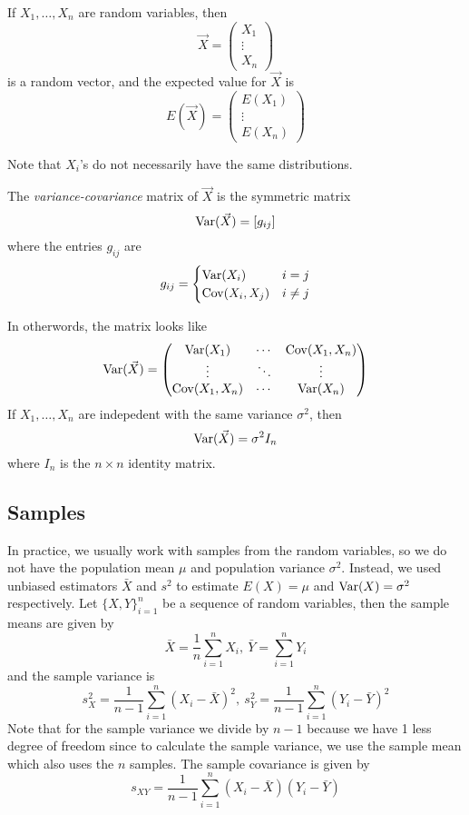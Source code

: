 \begin{definition}
    If $X_1, \ldots, X_n$ are random variables, then 
    \[\vec{X} = \begin{pmatrix}
        X_1 \\ \vdots \\ X_n
    \end{pmatrix}\]
    is a random vector, and the expected value for $\vec{X}$ is 
    \[E(\vec{X}) = \begin{pmatrix}
        E(X_1) \\ \vdots \\ E(X_n)
    \end{pmatrix}\]
\end{definition}
Note that $X_i$'s do not necessarily have the same distributions.
\begin{definition}
    The \emph{variance-covariance} matrix of $\vec{X}$ is the symmetric matrix 
    \[\operatorname{Var}(\vec{X}) = [g_{ij}]\]
    where the entries $g_{ij}$ are 
    \[g_{ij} = \begin{cases}
        \operatorname{Var}(X_i) & i = j\\
        \operatorname{Cov}(X_i, X_j) & i \neq j
    \end{cases}\]
\end{definition}
In otherwords, the matrix looks like 
\[\operatorname{Var}(\vec{X}) = \begin{pmatrix}
    \operatorname{Var}(X_1) & \cdots & \operatorname{Cov}(X_1,X_n) \\
    \vdots & \ddots & \vdots \\
    \operatorname{Cov}(X_1, X_n) & \cdots & \operatorname{Var}(X_n)
\end{pmatrix}\]
If $X_1, \ldots, X_n$ are indepedent with the same variance $\sigma^2$, then 
\[\operatorname{Var}(\Vec{X}) = \sigma^2I_n\]
where $I_n$ is the $n\times n$ identity matrix.
\subsection{Samples}
In practice, we usually work with samples from the random variables, so we do not have the population mean $\mu$ and population variance $\sigma^2$. Instead, we used unbiased estimators $\bar{X}$ and $s^2$ to estimate $E(X) = \mu$ and $\operatorname{Var}(X) = \sigma^2$ respectively. Let $\{X, Y\}_{i=1}^n$ be a sequence of random variables, then the sample means are given by 
\[\bar{X} = \frac{1}{n}\sum_{i=1}^n X_i, \ \bar{Y} = \sum_{i=1}^n Y_i\]
and the sample variance is 
\[s_X^2 = \frac{1}{n-1}\sum_{i=1}^n(X_i - \bar{X})^2, \ s_Y^2 = \frac{1}{n-1}\sum_{i=1}^n (Y_i - \bar{Y})^2\]
Note that for the sample variance we divide by $n-1$ because we have 1 less degree of freedom since to calculate the sample variance, we use the sample mean which also uses the $n$ samples. The sample covariance is given by 
\[s_{XY} = \frac{1}{n-1} \sum_{i=1}^n (X_i - \bar{X})(Y_i - \bar{Y})\]

